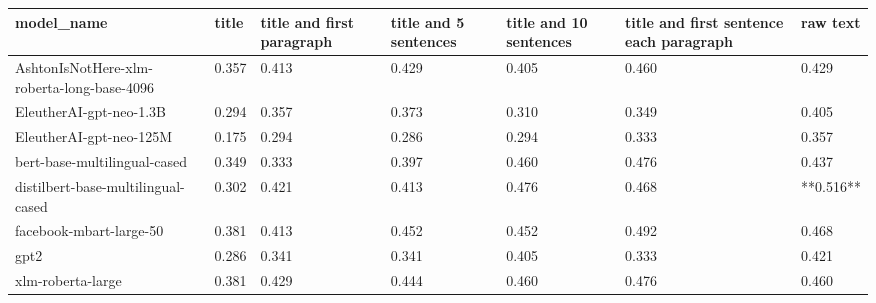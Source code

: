 \begin{tabular}{lllllll}
\toprule
                                model\_name & title & title and first paragraph & title and 5 sentences & title and 10 sentences & title and first sentence each paragraph &  raw text \\
\midrule
AshtonIsNotHere-xlm-roberta-long-base-4096 & 0.357 &                     0.413 &                 0.429 &                  0.405 &                                   0.460 &     0.429 \\
                   EleutherAI-gpt-neo-1.3B & 0.294 &                     0.357 &                 0.373 &                  0.310 &                                   0.349 &     0.405 \\
                   EleutherAI-gpt-neo-125M & 0.175 &                     0.294 &                 0.286 &                  0.294 &                                   0.333 &     0.357 \\
              bert-base-multilingual-cased & 0.349 &                     0.333 &                 0.397 &                  0.460 &                                   0.476 &     0.437 \\
        distilbert-base-multilingual-cased & 0.302 &                     0.421 &                 0.413 &                  0.476 &                                   0.468 & **0.516** \\
                   facebook-mbart-large-50 & 0.381 &                     0.413 &                 0.452 &                  0.452 &                                   0.492 &     0.468 \\
                                      gpt2 & 0.286 &                     0.341 &                 0.341 &                  0.405 &                                   0.333 &     0.421 \\
                         xlm-roberta-large & 0.381 &                     0.429 &                 0.444 &                  0.460 &                                   0.476 &     0.460 \\
\bottomrule
\end{tabular}
